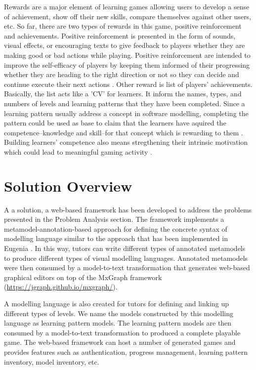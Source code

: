 \documentclass[conference]{IEEEtran}
\begin{document}
Rewards are a major element of learning games allowing users to develop a sense of achievement, show off their new skills, compare themselves against other users, etc. So far, there are two types of rewards in this game, positive reinforcement and achievements. Positive reinforcement is presented in the form of sounds, visual effects, or encouraging texts to give feedback to players whether they are making good or bad actions while playing. Positive reinforcement are intended to improve the self-efficacy of players by keeping them informed of their progressing whether they are heading to the right direction or not so they can decide and continue execute their next actions \cite{richter2015studying}. Other reward is list of players' achievements. Basically, the list acts like a 'CV' for learners. It inform the names, types, and numbers of levels and learning patterns that they have been completed. Since a learning pattern usually address a concept in software modelling, completing the pattern could be used as base to claim that the learners have aquired the competence--knowledge and skill--for that concept which is rewarding to them \cite{richter2015studying}. Building learners' competence also means stregthening their intrinsic motivation \cite{ryan2017self} which could lead to meaningful gaming activity \cite{nicholson2015recipe}.

\section{Solution Overview}
A a solution, a web-based framework has been developed to address the problems presented in the Problem Analysis section. The framework implements a metamodel-annotation-based approach for defining the concrete syntax of modelling language similar to the approach that has been implemented in Eugenia \cite{kolovos2015eugenia}. In this way, tutors can write different types of annotated metamodels to produce different types of visual modelling languages. Annotated metamodels were then consumed by a model-to-text transformation that generates web-based graphical editors on top of the MxGraph framework (\url{https://jgraph.github.io/mxgraph/}).

A modelling language is also created for tutors for defining and linking up different types of levels. We name the models constructed by this modelling language as learning pattern models. The learning pattern models are then consumed by a model-to-text transformation to produced a complete playable game. The web-based framework can host a number of generated games and provides features such as authentication, progress management, learning pattern inventory, model inventory, etc.
\end{document}
